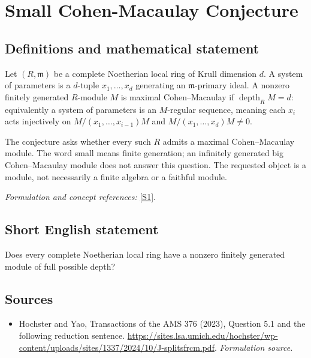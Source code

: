 \documentclass[11pt]{article}
\begin{document}
\section*{\texorpdfstring{Small Cohen-Macaulay Conjecture}{Small Cohen-Macaulay Conjecture}}\label{449}
\subsection{Definitions and mathematical statement}
Let $(R,\mathfrak m)$ be a complete Noetherian local ring of Krull dimension $d$. A system of parameters is a $d$-tuple $x_1,\ldots,x_d$ generating an $\mathfrak m$-primary ideal. A nonzero finitely generated $R$-module $M$ is maximal Cohen--Macaulay if $\operatorname{depth}_R M=d$: equivalently a system of parameters is an $M$-regular sequence, meaning each $x_i$ acts injectively on $M/(x_1,\ldots,x_{i-1})M$ and $M/(x_1,\ldots,x_d)M\ne0$.

The conjecture asks whether every such $R$ admits a maximal Cohen--Macaulay module. The word small means finite generation; an infinitely generated big Cohen--Macaulay module does not answer this question. The requested object is a module, not necessarily a finite algebra or a faithful module.
\par\smallskip\textit{Formulation and concept references:} \href{https://sites.lsa.umich.edu/hochster/wp-content/uploads/sites/1337/2024/10/J-splitsfrcm.pdf}{[S1]}.

\subsection{Short English statement}
Does every complete Noetherian local ring have a nonzero finitely generated module of full possible depth?
\subsection{Sources}
\begin{itemize}
\item[S1]Hochster and Yao, Transactions of the AMS 376 (2023), Question 5.1 and the following reduction sentence.
\url{https://sites.lsa.umich.edu/hochster/wp-content/uploads/sites/1337/2024/10/J-splitsfrcm.pdf}.
\textit{Formulation source.}
\end{itemize}
\end{document}
